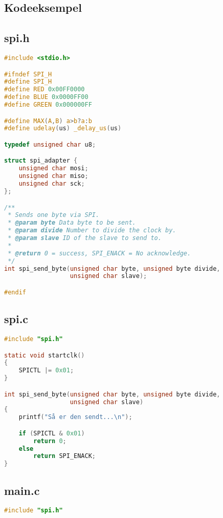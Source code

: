 \documentclass[article, 10pt]{memoir}
\begin{document}
\clearpage
\begin{landscape}
    \begin{multicols}{2}
        \chapter{Kodeeksempel}
        \section{spi.h}

        \begin{lstlisting}[language=c]
#include <stdio.h>

#ifndef SPI_H
#define SPI_H
#define RED 0x00FF0000
#define BLUE 0x0000FF00
#define GREEN 0x000000FF

#define MAX(A,B) a>b?a:b
#define udelay(us) _delay_us(us)

typedef unsigned char u8;

struct spi_adapter {
    unsigned char mosi;
    unsigned char miso;
    unsigned char sck;
};

/**
 * Sends one byte via SPI.
 * @param byte Data byte to be sent.
 * @param divide Number to divide the clock by.
 * @param slave ID of the slave to send to.
 *
 * @return 0 = success, SPI_ENACK = No acknowledge.
 */
int spi_send_byte(unsigned char byte, unsigned byte divide,
                  unsigned char slave);

#endif
        \end{lstlisting}

        \vfill
        \columnbreak
        \section{spi.c}
        \begin{lstlisting}[language=c]
#include "spi.h"

static void startclk()
{
    SPICTL |= 0x01;
}

int spi_send_byte(unsigned char byte, unsigned byte divide,
                  unsigned char slave)
{
    printf("Så er den sendt...\n");

    if (SPICTL & 0x01)
        return 0;
    else
        return SPI_ENACK;
}
        \end{lstlisting}

        \vfill
        \columnbreak

        \section{main.c}
        \begin{lstlisting}[language=c]
#include "spi.h"


\end{lstlisting}
\end{multicols}
\end{landscape}
\end{document}
